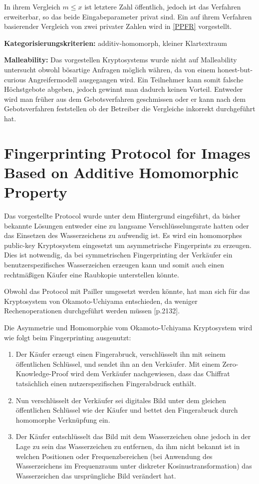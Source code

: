 In ihrem Vergleich $m\leq x$ ist letztere Zahl öffentlich, jedoch ist das Verfahren erweiterbar, so das beide Eingabeparameter privat sind. Ein auf ihrem Verfahren basierender Vergleich von zwei privater Zahlen wird in \ref{PPFR} vorgestellt.

\textbf{Kategorisierungskriterien:} additiv-homomorph, kleiner Klartextraum

\textbf{Malleability:} Das vorgestellen Kryptosystems wurde nicht auf Malleability untersucht obwohl bösartige Anfragen möglich währen, da von einem honest-but-curious Angreifermodell ausgegangen wird. Ein Teilnehmer kann somit falsche Höchstgebote abgeben, jedoch gewinnt man dadurch keinen Vorteil. Entweder wird man früher aus dem Gebotsverfahren geschmissen oder er kann nach dem Gebotsverfahren feststellen ob der Betreiber die Vergleiche inkorrekt durchgeführt hat.  

\section{Fingerprinting Protocol for Images Based on Additive Homomorphic Property}
\cite{kuribayashi2005fingerprinting}
Das vorgestellte Protocol wurde unter dem Hintergrund eingeführt, da bisher bekannte Lösungen entweder eine zu langsame Verschlüsselungsrate hatten oder das Einsetzen des Wasserzeichens zu aufwendig ist. Es wird ein homomorphes public-key Kryptosystem eingesetzt um asymmetrische Fingerprints zu erzeugen. Dies ist notwendig, da bei symmetrischen Fingerprinting der Verkäufer ein benutzerspezifisches Wasserzeichen erzeugen kann und somit auch einen rechtmäßigen Käufer eine Raubkopie unterstellen könnte.

Obwohl das Protocol mit Pailler umgesetzt werden könnte, hat man sich für das Kryptosystem von Okamoto-Uchiyama \cite{okamoto1998new} entschieden, da weniger Rechenoperationen durchgeführt werden müssen [p.2132].

Die Asymmetrie und Homomorphie vom Okamoto-Uchiyama Kryptosystem wird wie folgt beim Fingerprinting ausgenutzt:

\begin{enumerate}
	\item Der Käufer erzeugt einen Fingerabruck, verschlüsselt ihn mit seinem öffentlichen Schlüssel, und sendet ihn an den Verkäufer. Mit einem Zero-Knowledge-Proof wird dem Verkäufer nachgewiesen, dass das Chiffrat tatsächlich einen nutzerspezifischen Fingerabdruck enthält.
	\item Nun verschlüsselt der Verkäufer sei digitales Bild unter dem gleichen öffentlichen Schlüssel wie der Käufer und bettet den Fingerabruck durch homomorphe Verknüpfung ein.
	\item Der Käufer entschlüsselt das Bild mit dem Wasserzeichen ohne jedoch in der Lage zu sein das Wasserzeichen zu entfernen, da ihm nicht bekannt ist in welchen Positionen oder Frequenzbereichen (bei Anwendung des Wasserzeichens im Frequenzraum unter diskreter Kosinustransformation) das Wasserzeichen das ursprüngliche Bild verändert hat.
\end{enumerate}

